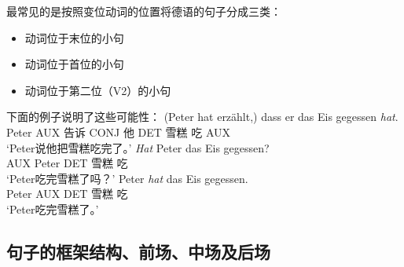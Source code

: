最常见的是按照变位动词的位置将德语的句子分成三类：
\begin{itemize}
\item 动词位于末位的小句
\item 动词位于首位的小句
\item 动词位于第二位（V2）的小句
\end{itemize}
%
下面的例子说明了这些可能性：
\eal
\ex 
\gll (Peter hat erzählt,) dass er das Eis gegessen \emph{hat}.\\
     Peter AUX 告诉 CONJ 他 DET 雪糕 吃 AUX\\
\glt `Peter说他把雪糕吃完了。'
\ex 
\gll \emph{Hat} Peter das Eis gegessen?\\
	 AUX Peter DET 雪糕 吃\\
\glt `Peter吃完雪糕了吗？'
\ex 
\gll Peter \emph{hat} das Eis gegessen.\\
	 Peter AUX DET 雪糕 吃\\
\glt `Peter吃完雪糕了。'
\zl


\subsection{句子的框架结构、前场、中场及后场}

